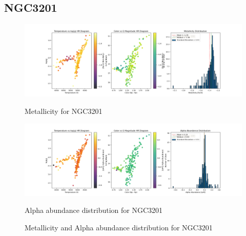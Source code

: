 \documentclass[a4paper,12pt]{article}
\begin{document}
\subsection{NGC3201}
\begin{figure}[H]
    \centering
    \begin{minipage}[b]{0.8\textwidth}
        \centering
        \includegraphics[width=\textwidth]{NGC3201_metalicity.png}
        \caption{Metallicity for NGC3201}
        \label{fig:NGC3201_metalicity}
    \end{minipage}
    \hfill
    \begin{minipage}[b]{0.8\textwidth}
        \centering
        \includegraphics[width=\textwidth]{NGC3201_alpha.png}
        \caption{Alpha abundance distribution for NGC3201}
        \label{fig:NGC3201_alpha}
    \end{minipage}
    \caption{Metallicity and Alpha abundance distribution for NGC3201}
    \label{fig:NGC3201_combined}
\end{figure}
\clearpage
\end{document}
